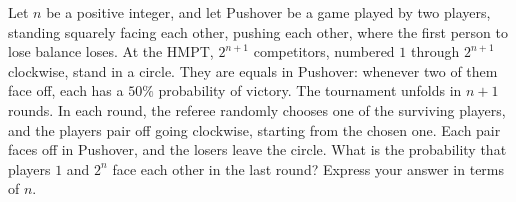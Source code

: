 Let $n$ be a positive integer, and let Pushover be a game played by two players, standing squarely facing each other, pushing each other, where the first person to lose balance loses. At the HMPT, $2^{n+1}$ competitors, numbered $1$ through $2^{n+1}$ clockwise, stand in a circle. They are equals in Pushover: whenever two of them face off, each has a $50\%$ probability of victory. The tournament unfolds in $n+1$ rounds. In each round, the referee randomly chooses one of the surviving players, and the players pair off going clockwise, starting from the chosen one. Each pair faces off in Pushover, and the losers leave the circle. What is the probability that players $1$ and $2^n$ face each other in the last round? Express your answer in terms of $n$.